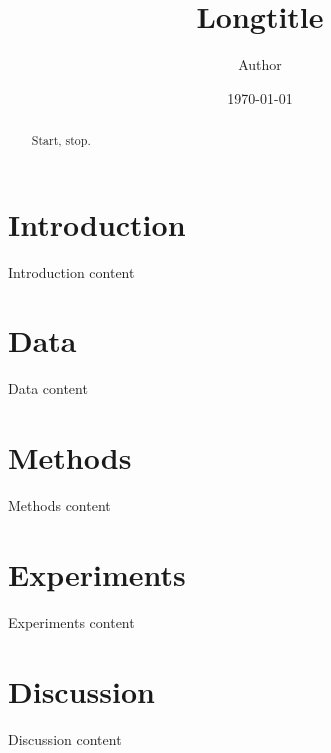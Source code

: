 \documentclass{amsart}
\title[Shorttitle]{Longtitle}
\author{Author}
\date{\today}
\newcommand{\arxiv}[1]{#1}
\newcommand{\notarxiv}[1]{}
\newcommand{\FIGshape}{\
\begin{figure}
\begin{center}
  \arxiv{\texttt{[image: theta\_shape.pdf]}}
\end{center}
\caption{\
  As $\theta$ goes to zero, the $g_\theta$ converge pointwise to $g$, which is 1 on the interior of the unit interval and 0 on the boundaries.
}
\label{FIGshape}
\end{figure}
}
\begin{document}
\begin{abstract}
Start, stop.
\end{abstract}

\maketitle

\section{Introduction}
Introduction content

\section{Data}
Data content

\section{Methods}
Methods content

\section{Experiments}
Experiments content

\section{Discussion}
Discussion content




\notarxiv{
\section{Figure Legends}
\FIGshape
\renewcommand{\thefigure}{S\arabic{figure}} %
\setcounter{figure}{0} %
}




\end{document}
